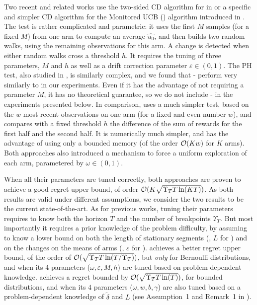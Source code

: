 Two recent and related works use
the two-sided \CUSUM{} CD algorithm for \CUSUMUCB{} in \cite{LiuLeeShroff17}
or a specific and simpler CD algorithm for the Monitored UCB (\MUCB) algorithm introduced in \cite{CaoZhenKvetonXie18}.
%
The \CUSUM{} test is rather complicated and parametric: it uses the first $M$ samples (for a fixed $M$) from one arm to compute an average $\hat{u_0}$, and then builds two random walks, using the remaining observations for this arm. A change is detected when either random walks cross a threshold $h$.
It requires the tuning of three parameters, $M$ and $h$ as well as a drift correction parameter $\varepsilon\in(0,1)$.
The PH test, also studied in \cite{LiuLeeShroff17}, is similarly complex,
and we found that \PHT-\UCB{} perform very similarly to \CUSUMUCB{} in our experiments.
Even if it has the advantage of not requiring a parameter $M$,
it has no theoretical guarantee, so we do not include \PHT-\UCB{} in the experiments presented below.
%
In comparison, \MUCB{} uses a much simpler test, based on the $w$ most recent observations on one arm (for a fixed and even number $w$), and compares with a fixed threshold $h$ the difference of the sum of rewards for the first half and the second half. It is numerically much simpler, and has the advantage of using only a bounded memory (of the order $\mathop{}\mathopen{}\mathcal{O}\mathopen{}\left(K w\right)$ for $K$ arms).
%
Both approaches also introduced a mechanism to force a uniform exploration of each arm, parametered by $\omega\in(0,1)$.

When all their parameters are tuned correctly, both approaches are proven to achieve a good regret upper-bound, of order $\mathcal{O}(K \sqrt{\Upsilon_T T \ln(K T)})$.
As both results are valid under different assumptions, we consider the two results to be the current state-of-the-art.
As for previous works, tuning their parameters requires to know both the horizon $T$ and the number of breakpoints $\Upsilon_T$.
But most importantly it requires a prior knowledge of the problem difficulty, by assuming to know a lower bound on both the length of stationary segments (\eg, $L$ for \MUCB) and on the changes on the means of arms (\eg, $\varepsilon$ for \CUSUM).
%
\CUSUMUCB{} achieves a better regret upper bound, of the order of $\mathcal{O}(\sqrt{\Upsilon_T T \ln(T / \Upsilon_T)})$, but \emph{only} for Bernoulli distributions,
and when its $4$ parameters ($\omega,\varepsilon,M,h$) are tuned based on problem-dependent knowledge.
%
\MUCB{} achieves a regret bounded by $\mathcal{O}(\sqrt{\Upsilon_T T \ln(T)})$, for bounded distributions, and when its $4$ parameters ($\omega,w,b,\gamma$) are also tuned based on a problem-dependent knowledge of $\tilde{\delta}$ and $L$ (see Assumption~1 and Remark~1 in \cite{CaoZhenKvetonXie18}).


